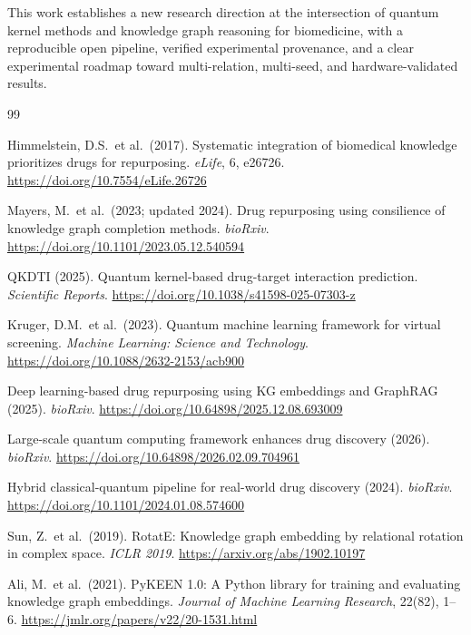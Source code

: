 \documentclass[twocolumn,10pt]{article}
\begin{document}
This work establishes a new research direction at the intersection of quantum kernel methods and knowledge graph reasoning for biomedicine, with a reproducible open pipeline, verified experimental provenance, and a clear experimental roadmap toward multi-relation, multi-seed, and hardware-validated results.


\begin{thebibliography}{99}

Himmelstein, D.S.\ et al.\ (2017).
Systematic integration of biomedical knowledge prioritizes drugs for repurposing.
\textit{eLife}, 6, e26726.
\url{https://doi.org/10.7554/eLife.26726}

Mayers, M.\ et al.\ (2023; updated 2024).
Drug repurposing using consilience of knowledge graph completion methods.
\textit{bioRxiv}.
\url{https://doi.org/10.1101/2023.05.12.540594}

QKDTI (2025).
Quantum kernel-based drug-target interaction prediction.
\textit{Scientific Reports}.
\url{https://doi.org/10.1038/s41598-025-07303-z}

Kruger, D.M.\ et al.\ (2023).
Quantum machine learning framework for virtual screening.
\textit{Machine Learning: Science and Technology}.
\url{https://doi.org/10.1088/2632-2153/acb900}

Deep learning-based drug repurposing using KG embeddings and GraphRAG (2025).
\textit{bioRxiv}.
\url{https://doi.org/10.64898/2025.12.08.693009}

Large-scale quantum computing framework enhances drug discovery (2026).
\textit{bioRxiv}.
\url{https://doi.org/10.64898/2026.02.09.704961}

Hybrid classical-quantum pipeline for real-world drug discovery (2024).
\textit{bioRxiv}.
\url{https://doi.org/10.1101/2024.01.08.574600}

Sun, Z.\ et al.\ (2019).
RotatE: Knowledge graph embedding by relational rotation in complex space.
\textit{ICLR 2019}.
\url{https://arxiv.org/abs/1902.10197}

Ali, M.\ et al.\ (2021).
PyKEEN 1.0: A Python library for training and evaluating knowledge graph embeddings.
\textit{Journal of Machine Learning Research}, 22(82), 1--6.
\url{https://jmlr.org/papers/v22/20-1531.html}


\end{thebibliography}
\end{document}
